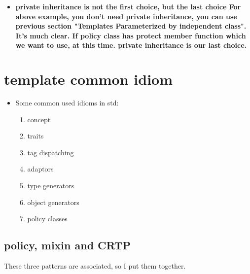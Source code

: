 \documentclass[a4paper,11pt,twoside]{book}
\begin{document}
\begin{itemize}
\item \textbf{private inheritance is not the first choice, but the last choice For above example, you don't need private inheritance, you can use previous section "Templates Parameterized by independent class". It's much clear. If policy class has protect member function which we want to use, at this time. private inheritance is our last choice. }
\end{itemize}

\section{template common idiom}
\begin{itemize}
	\item Some common used idioms in std:
	\begin{enumerate}
		\item concept
		\item traits
		\item tag dispatching
		\item adaptors
		\item type generators
		\item object generators
		\item policy classes
	\end{enumerate}

	
\end{itemize}

\subsection{policy, mixin and CRTP}
These three patterns are associated, so I put them together. 
\end{document}
